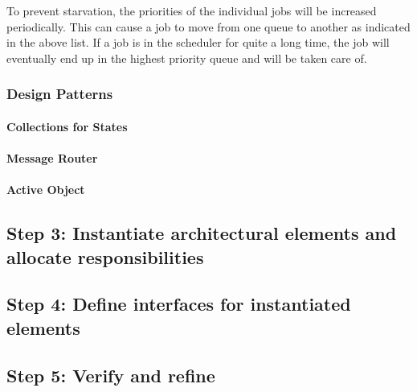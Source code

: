 \npar To prevent starvation, the priorities of the individual jobs will be
increased periodically. This can cause a job to move from one queue to another
as indicated in the above list. If a job is in the scheduler for quite a long
time, the job will eventually end up in the highest priority queue and will be
taken care of.

\subsubsection{Design Patterns}
\label{add:it3/patterns}

\paragraph{Collections for States}

\paragraph{Message Router}

\paragraph{Active Object}

\paragraph{}

\subsection{Step 3: Instantiate architectural elements and allocate responsibilities}
\label{add:it3/elements}

\npar 

\subsection{Step 4: Define interfaces for instantiated elements}
\label{add:it3/interfaces}

\subsection{Step 5: Verify and refine}
\label{add:it3/verification}